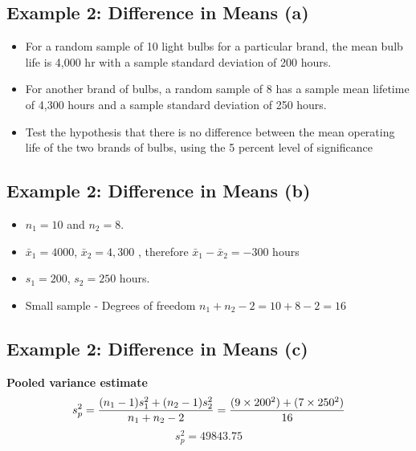 \documentclass[a4paper,12pt]{article}
\begin{document}

\subsection*{Example 2: Difference in Means (a) }
\begin{itemize}
\item For a random sample of 10 light bulbs for a particular brand, the mean bulb life is 4,000 hr with a sample standard deviation of 200 hours.
\item For another brand of bulbs, a random sample of 8 has a sample mean lifetime of 4,300 hours
and a sample standard deviation of 250 hours. \item Test the hypothesis that there is no difference between the
mean operating life of the two brands of bulbs, using the 5 percent level of significance
\end{itemize}
\medskip



\subsection*{Example 2: Difference in Means (b) }
\begin{itemize}\item $n_1 = 10$ and $n_2 = 8$.
\item $\bar{x}_1 = 4000$, $\bar{x}_2 = 4,300 $ , therefore  $\bar{x}_1 - \bar{x}_2 = -300$ hours
\item $s_1  = 200$, $s_2 = 250$ hours.
\item Small sample - Degrees of freedom $n_1 + n_2 - 2 = 10 + 8 - 2 = 16$
\end{itemize}\medskip

\subsection*{Example 2: Difference in Means (c) }
\textbf{Pooled variance estimate}
\[ s^2_p = {(n_1 - 1)s^2_1  + (n_2 - 1)s^2_ 2\over n_1 + n_2 - 2 } = {(9 \times 200^2 ) +( 7 \times 250^2) \over 16 }  \]
\[ s^2_p  = 49843.75 \]
\medskip

\end{document}
